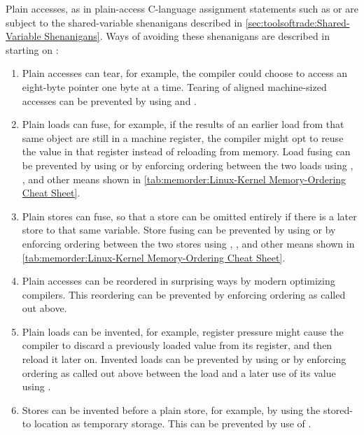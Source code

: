 Plain accesses, as in plain-access C-language assignment statements such
as  or  are subject to the
shared-variable shenanigans described in
\cref{sec:toolsoftrade:Shared-Variable Shenanigans}.
Ways of avoiding these shenanigans are described in
starting on
:

\begin{enumerate}
\item	Plain accesses can tear, for example, the compiler could choose
	to access an eight-byte pointer one byte at a time.
	Tearing of aligned machine-sized accesses can be prevented by
	using  and .
\item	Plain loads can fuse, for example, if the results of an earlier
	load from that same object are still in a machine register,
	the compiler might opt to reuse the value in that register
	instead of reloading from memory.
	Load fusing can be prevented by using  or by
	enforcing ordering between the two loads using ,
	, and other means shown in
	\cref{tab:memorder:Linux-Kernel Memory-Ordering Cheat Sheet}.
\item	Plain stores can fuse, so that a store can be omitted entirely
	if there is a later store to that same variable.
	Store fusing can be prevented by using  or by
	enforcing ordering between the two stores using ,
	, and other means shown in
	\cref{tab:memorder:Linux-Kernel Memory-Ordering Cheat Sheet}.
\item	Plain accesses can be reordered in surprising ways by modern
	optimizing compilers.
	This reordering can be prevented by enforcing ordering as
	called out above.
\item	Plain loads can be invented, for example, register pressure might
	cause the compiler to discard a previously loaded value from
	its register, and then reload it later on.
	Invented loads can be prevented by using  or by
	enforcing ordering as called out above between the load and a
	later use of its value using .
\item	Stores can be invented before a plain store, for example, by
	using the stored-to location as temporary storage.
	This can be prevented by use of .
\end{enumerate}

\QuickQuizEnd

